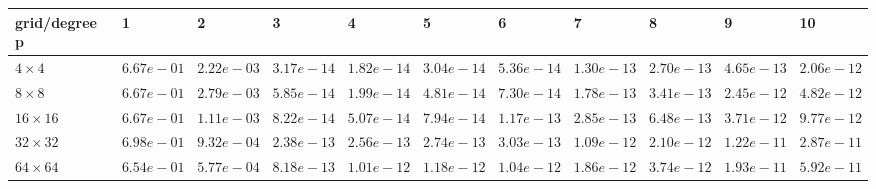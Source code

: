 \begin{tabular}{lllllllllll}
\hline
 grid/degree p   & 1          & 2          & 3          & 4          & 5          & 6          & 7          & 8          & 9          & 10         \\
\hline
 $4 \times 4$    & $6.67e-01$ & $2.22e-03$ & $3.17e-14$ & $1.82e-14$ & $3.04e-14$ & $5.36e-14$ & $1.30e-13$ & $2.70e-13$ & $4.65e-13$ & $2.06e-12$ \\
 $8 \times 8$    & $6.67e-01$ & $2.79e-03$ & $5.85e-14$ & $1.99e-14$ & $4.81e-14$ & $7.30e-14$ & $1.78e-13$ & $3.41e-13$ & $2.45e-12$ & $4.82e-12$ \\
 $16 \times 16$  & $6.67e-01$ & $1.11e-03$ & $8.22e-14$ & $5.07e-14$ & $7.94e-14$ & $1.17e-13$ & $2.85e-13$ & $6.48e-13$ & $3.71e-12$ & $9.77e-12$ \\
 $32 \times 32$  & $6.98e-01$ & $9.32e-04$ & $2.38e-13$ & $2.56e-13$ & $2.74e-13$ & $3.03e-13$ & $1.09e-12$ & $2.10e-12$ & $1.22e-11$ & $2.87e-11$ \\
 $64 \times 64$  & $6.54e-01$ & $5.77e-04$ & $8.18e-13$ & $1.01e-12$ & $1.18e-12$ & $1.04e-12$ & $1.86e-12$ & $3.74e-12$ & $1.93e-11$ & $5.92e-11$ \\
\hline
\end{tabular}